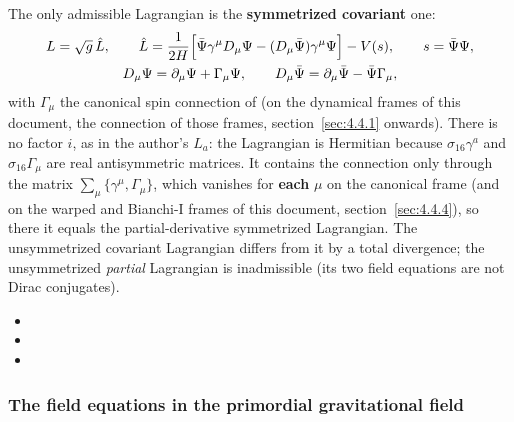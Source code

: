The only admissible Lagrangian is the \textbf{symmetrized covariant} one:
\begin{gather*}
  L=\sqrt g\,\hat L,\qquad
  \hat L=\frac{1}{2H}\Bigl[\bar\Psi\gamma^\mu D_\mu\Psi-(D_\mu\bar\Psi)\gamma^\mu\Psi\Bigr]-V(s),\qquad s=\bar\Psi\Psi,\\
  D_\mu\Psi=\partial_\mu\Psi+\Gamma_\mu\Psi,\qquad D_\mu\bar\Psi=\partial_\mu\bar\Psi-\bar\Psi\Gamma_\mu ,
\end{gather*}
with $\Gamma_\mu$ the canonical spin connection of  (on the dynamical frames of this document,
the connection of those frames, section~\ref{sec:4.4.1} onwards). There is no factor $i$, as in the
author's $L_a$: the Lagrangian is Hermitian because $\sigma_{16}\gamma^a$ and $\sigma_{16}\Gamma_\mu$
are real antisymmetric matrices. It contains the connection only through the matrix
$\sum_\mu\{\gamma^\mu,\Gamma_\mu\}$, which vanishes for \textbf{each} $\mu$ on the canonical frame (and on
the warped and Bianchi-I frames of this document, section~\ref{sec:4.4.4}), so there it equals the
partial-derivative symmetrized Lagrangian. The unsymmetrized covariant Lagrangian differs from it by a
total divergence; the unsymmetrized \emph{partial} Lagrangian is inadmissible (its two field equations
are not Dirac conjugates). 
\begin{itemize}
  \item {}
  \item {}
  \item {}
\end{itemize}

\subsubsection{The field equations in the primordial gravitational field}
\label{sec:4.1.3}

